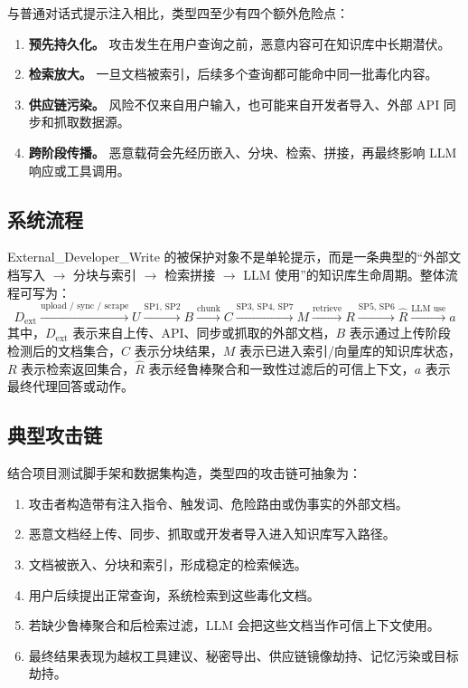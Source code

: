 \documentclass[11pt,a4paper]{ctexart}
\begin{document}
与普通对话式提示注入相比，类型四至少有四个额外危险点：
\begin{enumerate}[leftmargin=2em]
  \item \textbf{预先持久化。} 攻击发生在用户查询之前，恶意内容可在知识库中长期潜伏。
  \item \textbf{检索放大。} 一旦文档被索引，后续多个查询都可能命中同一批毒化内容。
  \item \textbf{供应链污染。} 风险不仅来自用户输入，也可能来自开发者导入、外部 API 同步和抓取数据源。
  \item \textbf{跨阶段传播。} 恶意载荷会先经历嵌入、分块、检索、拼接，再最终影响 LLM 响应或工具调用。
\end{enumerate}

\subsection{系统流程}
External\_Developer\_Write 的被保护对象不是单轮提示，而是一条典型的“外部文档写入 $\rightarrow$ 分块与索引 $\rightarrow$ 检索拼接 $\rightarrow$ LLM 使用”的知识库生命周期。整体流程可写为：
\begin{equation}
D_{\text{ext}}
\xrightarrow{\text{upload / sync / scrape}}
U
\xrightarrow{\text{SP1, SP2}}
B
\xrightarrow{\text{chunk}}
C
\xrightarrow{\text{SP3, SP4, SP7}}
M
\xrightarrow{\text{retrieve}}
R
\xrightarrow{\text{SP5, SP6}}
\hat{R}
\xrightarrow{\text{LLM use}}
a
\end{equation}
其中，$D_{\text{ext}}$ 表示来自上传、API、同步或抓取的外部文档，$B$ 表示通过上传阶段检测后的文档集合，$C$ 表示分块结果，$M$ 表示已进入索引/向量库的知识库状态，$R$ 表示检索返回集合，$\hat{R}$ 表示经鲁棒聚合和一致性过滤后的可信上下文，$a$ 表示最终代理回答或动作。

\subsection{典型攻击链}
结合项目测试脚手架和数据集构造，类型四的攻击链可抽象为：
\begin{enumerate}[leftmargin=2em]
  \item 攻击者构造带有注入指令、触发词、危险路由或伪事实的外部文档。
  \item 恶意文档经上传、同步、抓取或开发者导入进入知识库写入路径。
  \item 文档被嵌入、分块和索引，形成稳定的检索候选。
  \item 用户后续提出正常查询，系统检索到这些毒化文档。
  \item 若缺少鲁棒聚合和后检索过滤，LLM 会把这些文档当作可信上下文使用。
  \item 最终结果表现为越权工具建议、秘密导出、供应链镜像劫持、记忆污染或目标劫持。
\end{enumerate}
\end{document}
